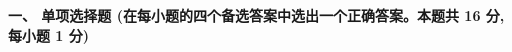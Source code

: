 \documentclass{ctexart} %
\begin{document}
\pagestyle{plain} %


\raggedright %
\textbf{\large 一、 单项选择题 (在每小题的四个备选答案中选出一个正确答案。本题共 16 分, 每小题 1 分)} %
\vspace{1em}
\end{document}
